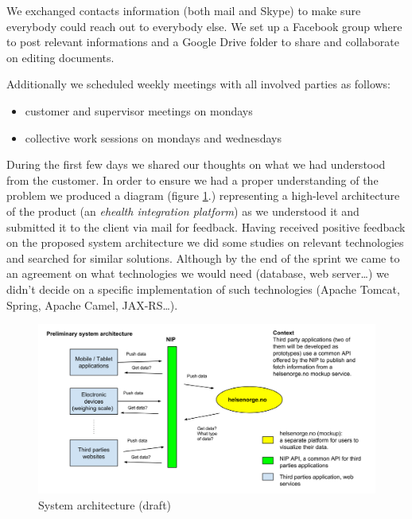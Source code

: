 We exchanged contacts information (both mail and Skype) to make sure everybody could reach out to
everybody else. We set up a Facebook group where to post relevant informations
and a Google Drive folder to share and collaborate on editing documents.

Additionally we scheduled weekly meetings with all involved parties as follows:
\begin{itemize}
\item customer and supervisor meetings on mondays
\item collective work sessions on mondays and wednesdays
\end{itemize}

During the first few days we shared our thoughts on what we had understood from the customer.
In order to ensure we had a proper understanding of the problem we produced a diagram
(figure \ref{figure:architecture-draft}.) representing a high-level architecture
of the product (an \textit{ehealth integration platform}) as we understood it and submitted
it to the client via mail for feedback.
Having received positive feedback on the proposed system architecture we did some studies
on relevant technologies and searched for similar solutions. Although by the end of the
sprint we came to an agreement on what technologies we would need (database, web server\ldots)
we didn't decide on a specific implementation of such technologies (Apache Tomcat, Spring,
Apache Camel, JAX-RS\ldots).

\begin{figure}
\centering
\includegraphics[scale=0.30]{../Figures/architecture-draft.png}
\caption{System architecture (draft)}
\label{figure:architecture-draft}
\end{figure}

